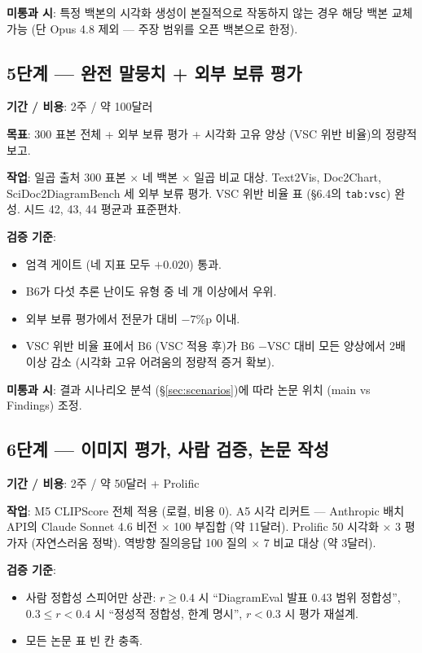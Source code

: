 \documentclass[11pt]{article}
\begin{document}
\textbf{미통과 시}: 특정 백본의 시각화 생성이 본질적으로 작동하지 않는 경우 해당 백본 교체 가능 (단 Opus 4.8 제외 — 주장 범위를 오픈 백본으로 한정).

\subsection{5단계 — 완전 말뭉치 + 외부 보류 평가}

\textbf{기간 / 비용}: 2주 / 약 100달러

\textbf{목표}: 300 표본 전체 + 외부 보류 평가 + 시각화 고유 양상 (VSC 위반 비율)의 정량적 보고.

\textbf{작업}: 일곱 출처 300 표본 × 네 백본 × 일곱 비교 대상. Text2Vis, Doc2Chart, SciDoc2DiagramBench 세 외부 보류 평가. VSC 위반 비율 표 (\S 6.4의 \texttt{tab:vsc}) 완성. 시드 42, 43, 44 평균과 표준편차.

\textbf{검증 기준}:
\begin{itemize}[leftmargin=*]
    \item 엄격 게이트 (네 지표 모두 $+0.020$) 통과.
    \item B6가 다섯 추론 난이도 유형 중 네 개 이상에서 우위.
    \item 외부 보류 평가에서 전문가 대비 $-7\%$p 이내.
    \item VSC 위반 비율 표에서 B6 (VSC 적용 후)가 B6 −VSC 대비 모든 양상에서 2배 이상 감소 (시각화 고유 어려움의 정량적 증거 확보).
\end{itemize}

\textbf{미통과 시}: 결과 시나리오 분석 (\S \ref{sec:scenarios})에 따라 논문 위치 (main vs Findings) 조정.

\subsection{6단계 — 이미지 평가, 사람 검증, 논문 작성}

\textbf{기간 / 비용}: 2주 / 약 50달러 + Prolific

\textbf{작업}: M5 CLIPScore 전체 적용 (로컬, 비용 0). A5 시각 리커트 — Anthropic 배치 API의 Claude Sonnet 4.6 비전 × 100 부집합 (약 11달러). Prolific 50 시각화 × 3 평가자 (자연스러움 정박). 역방향 질의응답 100 질의 × 7 비교 대상 (약 3달러).

\textbf{검증 기준}:
\begin{itemize}[leftmargin=*]
    \item 사람 정합성 스피어만 상관: $r \geq 0.4$ 시 ``DiagramEval 발표 0.43 범위 정합성'', $0.3 \leq r < 0.4$ 시 ``정성적 정합성, 한계 명시'', $r < 0.3$ 시 평가 재설계.
    \item 모든 논문 표 빈 칸 충족.
\end{itemize}
\end{document}
